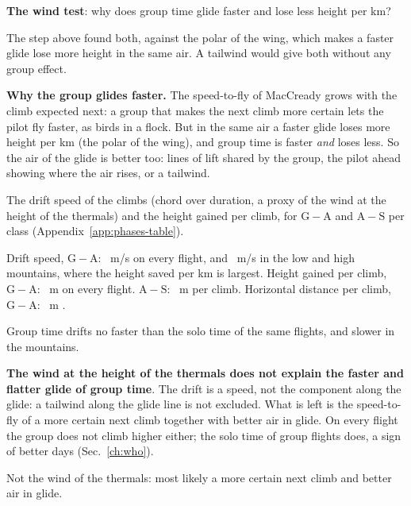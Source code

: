 \documentclass[10pt,a4paper]{article}
\newcommand{\G}{\mathrm{G}}
\newcommand{\A}{\mathrm{A}}
\newcommand{\Sl}{\mathrm{S}}
\newcommand{\Q}{\item[\textcolor{question}{\textbf{Q.}}]\color{question}}
\newcommand{\Res}{\item[\textcolor{answer}{\textbf{Result.}}]\color{black}}
\newcommand{\Home}{\item[\textcolor{answer}{\textbf{Take home.}}]\color{black}}
\newcommand{\Obs}{\item[\textcolor{answer}{\textbf{Observation.}}]\color{black}}
\newcommand{\Hyp}{\item[\textcolor{question}{\textbf{Hypothesis.}}]\color{question}}
\newcommand{\Ded}{\item[\textcolor{answer}{\textbf{Deduction.}}]\color{black}}
\newcommand{\Why}{\item[\textcolor{black}{\textbf{Why.}}]\color{black}}
\newcommand{\Tool}{\item[\textcolor{black}{\textbf{Tool.}}]\color{black}}
\newenvironment{step}{\begin{description}[leftmargin=0pt, itemsep=7pt, topsep=8pt]}{\end{description}}
\begin{document}
\begin{step}
\Q \textbf{The wind test}: why does group time glide faster and lose less height per km?
\Why The step above found both, against the polar of the wing, which makes a faster glide lose more height in the
  same air. A tailwind would give both without any group effect.
\Hyp \textbf{Why the group glides faster.} The speed-to-fly of MacCready grows with the climb expected next: a group
  that makes the next climb more certain lets the pilot fly faster, as birds in a flock. But in the same air a
  faster glide loses more height per km (the polar of the wing), and group time is faster \emph{and} loses less.
  So the air of the glide is better too: lines of lift shared by the group, the pilot ahead showing where the air
  rises, or a tailwind.
\Tool The drift speed of the climbs (chord over duration, a proxy of the wind at the height of the thermals) and
  the height gained per climb, for $\G-\A$ and $\A-\Sl$ per class (Appendix~\ref{app:phases-table}).
\Res Drift speed, $\G-\A$: \PhDriftGAAll~m/s on every flight, \PhDriftGALowMtn{} and \PhDriftGAHighMtn~m/s in the low
  and high mountains, where the height saved per km is largest. Height gained per climb, $\G-\A$: \PhGainGAAll~m on every
  flight. $\A-\Sl$: \PhGainASAll~m per climb. Horizontal distance per climb, $\G-\A$: \PhChordGAAll~m
  \PhChordGAAllBand.
\Obs Group time drifts no faster than the solo time of the same flights, and slower in the mountains.
\Ded \textbf{The wind at the height of the thermals does not explain the faster and flatter glide of group
  time}. The drift is a speed, not the component along the glide: a tailwind along the glide line is not
  excluded. What is left is the speed-to-fly of a more certain next climb together with better air in glide. On
  every flight the group does not climb higher either; the solo time of group flights does, a sign of better days
  (Sec.~\ref{ch:who}).
\Home Not the wind of the thermals: most likely a more certain next climb and better air in glide.
\end{step}
\end{document}
